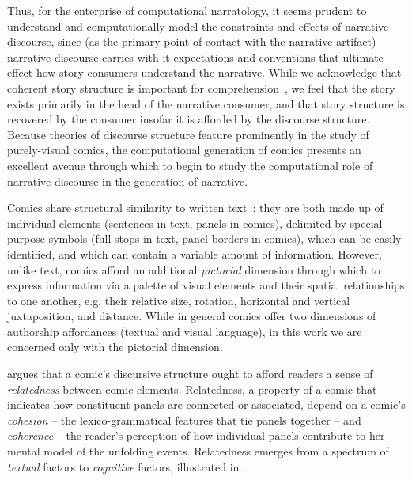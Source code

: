 Thus, for the enterprise of computational narratology, it seems prudent to
understand and computationally model the constraints and effects of narrative
discourse, since (as the primary point of contact with the narrative artifact)
narrative discourse carries with it expectations and conventions that ultimate
effect how story consumers understand the narrative. While we acknowledge that
coherent story structure is important for comprehension~\cite{graesser2002how},
we feel that the story exists primarily in the head of the narrative consumer,
and that story structure is recovered by the consumer insofar it is afforded by
the discourse structure. Because theories of discourse structure feature
prominently in the study of purely-visual comics, the computational generation
of comics presents an excellent avenue through which to begin to study the
computational role of narrative discourse in the generation of narrative.

Comics share structural similarity to written
text~\cite{saraceni2016relatedness}: they are both made up of individual
elements (sentences in text, panels in comics), delimited by special-purpose
symbols (full stops in text, panel borders in comics), which can be easily
identified, and which can contain a variable amount of information. However,
unlike text, comics afford an additional \emph{pictorial} dimension through
which to express information via a palette of visual elements and their spatial
relationships to one another, e.g. their relative size, rotation, horizontal and
vertical juxtaposition, and distance. While in general comics offer two
dimensions of authorship affordances (textual and visual language), in this work
we are concerned only with the pictorial dimension.

\citeauthor{saraceni2016relatedness} argues that a comic's discursive structure
ought to afford readers a sense of \emph{relatedness} between comic elements.
Relatedness, a property of a comic that indicates how constituent panels are
connected or associated, depend on a comic's \emph{cohesion} -- the
lexico-grammatical features that tie panels together -- and \emph{coherence} --
the reader's perception of how individual panels contribute to her mental model
of the unfolding events. Relatedness emerges from a spectrum of \emph{textual}
factors to \emph{cognitive} factors, illustrated in .


